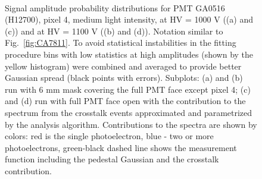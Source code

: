 \begin{figure}[h!bt] 
\centering 
   \\
  \caption{Signal amplitude probability distributions for PMT GA0516 (H12700), pixel 4, medium light intensity, at HV = 1000 V ((a) and (c)) and at HV = 1100 V ((b) and (d)). Notation similar to Fig.~\ref{fig:CA7811}. To avoid statistical instabilities in the fitting procedure bins with low statistics at high amplitudes (shown by the yellow histogram) were combined and averaged to provide better Gaussian spread (black points with errors).  Subplots: (a) and (b) run with 6 mm mask covering the full PMT face except pixel 4; (c) and (d) run with full PMT face open with the contribution to the spectrum from the crosstalk events approximated and parametrized by the analysis algorithm. Contributions to the spectra are shown by colors: red is the single photoelectron, blue - two or more photoelectrons, green-black dashed line shows the measurement function including the pedestal Gaussian and the crosstalk contribution. 
    }
\label{fig:GA0516_3}
\end{figure}
